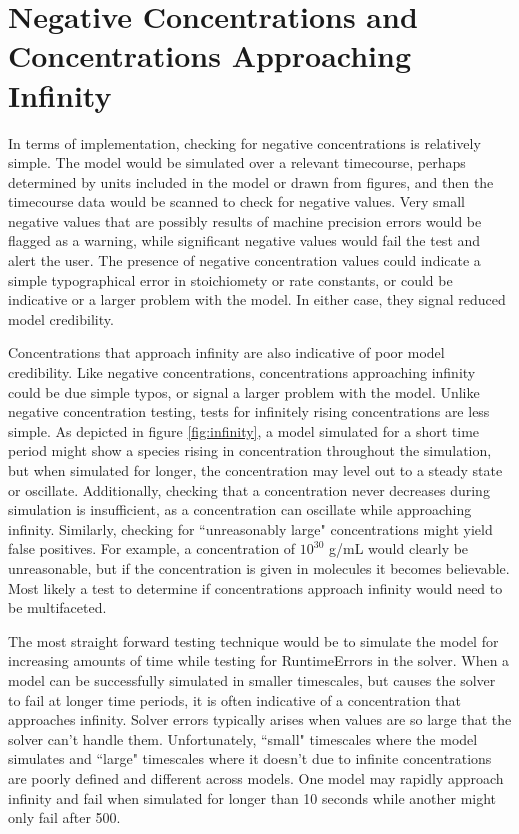 \documentclass[12pt]{report}
\begin{document}
\section{Negative Concentrations and Concentrations Approaching Infinity}
In terms of implementation, checking for negative concentrations is relatively simple. The model would be simulated over a relevant timecourse, perhaps determined by units included in the model or drawn from figures, and then the timecourse data would be scanned to check for negative values. Very small negative values that are possibly results of machine precision errors would be flagged as a warning, while significant negative values would fail the test and alert the user. The presence of negative concentration values could indicate a simple typographical error in stoichiomety or rate constants, or could be indicative or a larger problem with the model. In either case, they signal reduced model credibility.

Concentrations that approach infinity are also indicative of poor model credibility. Like negative concentrations, concentrations approaching infinity could be due simple typos, or signal a larger problem with the model. Unlike negative concentration testing, tests for infinitely rising concentrations are less simple. As depicted in figure \ref{fig:infinity}, a model simulated for a short time period might show a species rising in concentration throughout the simulation, but when simulated for longer, the concentration may level out to a steady state or oscillate. Additionally, checking that a concentration never decreases during simulation is insufficient, as a concentration can oscillate while approaching infinity. Similarly, checking for ``unreasonably large" concentrations might yield false positives. For example, a concentration of $10^30$ g/mL would clearly be unreasonable, but if the concentration is given in molecules it becomes believable. Most likely a test to determine if concentrations approach infinity would need to be multifaceted.

The most straight forward testing technique would be to simulate the model for increasing amounts of time while testing for RuntimeErrors in the solver. When a model can be successfully simulated in smaller timescales, but causes the solver to fail at longer time periods, it is often indicative of a concentration that approaches infinity. Solver  errors typically arises when values are so large that the solver can't handle them. Unfortunately, ``small" timescales where the model simulates and ``large" timescales where it doesn't due to infinite concentrations are poorly defined and different across models. One model may rapidly approach infinity and fail when simulated for longer than 10 seconds while another might only fail after 500. 
\end{document}
